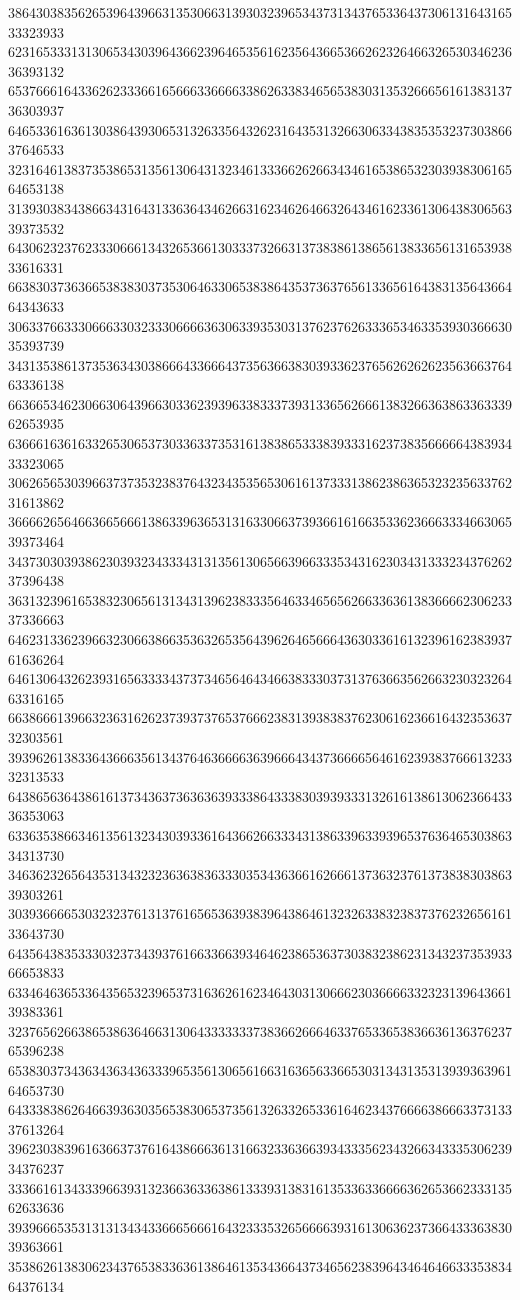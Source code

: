 38643038356265396439663135306631393032396534373134376533643730613164316533323933
62316533313130653430396436623964653561623564366536626232646632653034623636393132
65376661643362623336616566633666633862633834656538303135326665616138313736303937
64653361636130386439306531326335643262316435313266306334383535323730386637646533
32316461383735386531356130643132346133366262663434616538653230393830616564653138
31393038343866343164313363643462663162346264663264346162336130643830656339373532
64306232376233306661343265366130333732663137383861386561383365613165393833616331
66383037363665383830373530646330653838643537363765613365616438313564366464343633
30633766333066633032333066663630633935303137623762633365346335393036663035393739
34313538613735363430386664336664373563663830393362376562626262356366376463336138
66366534623066306439663033623939633833373931336562666138326636386336333962653935
63666163616332653065373033633735316138386533383933316237383566666438393433323065
30626565303966373735323837643234353565306161373331386238636532323563376231613862
36666265646636656661386339636531316330663739366161663533623666333466306539373464
34373030393862303932343334313135613065663966333534316230343133323437626237396438
36313239616538323065613134313962383335646334656562663363613836666230623337336663
64623133623966323066386635363265356439626465666436303361613239616238393761636264
64613064326239316563333437373465646434663833303731376366356266323032326463316165
66386661396632363162623739373765376662383139383837623061623661643235363732303561
39396261383364366635613437646366663639666434373666656461623938376661323332313533
64386563643861613734363736363639333864333830393933313261613861306236643336353063
63363538663461356132343039336164366266333431386339633939653763646530386334313730
34636232656435313432323636383633303534363661626661373632376137383830386339303261
30393666653032323761313761656536393839643864613232633832383737623265616133643730
64356438353330323734393761663366393464623865363730383238623134323735393366653833
63346463653364356532396537316362616234643031306662303666633232313964366139383361
32376562663865386364663130643333333738366266646337653365383663613637623765396238
65383037343634363436333965356130656166316365633665303134313531393936396164653730
64333838626466393630356538306537356132633265336164623437666638666337313337613264
39623038396163663737616438666361316632336366393433356234326634333530623934376237
33366161343339663931323663633638613339313831613533633666636265366233313562633636
39396665353131313434336665666164323335326566663931613063623736643336383039363661
35386261383062343765383363613864613534366437346562383964346464663335383464376134
